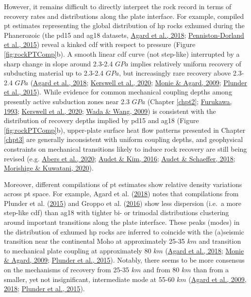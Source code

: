 However, it remains difficult to directly interpret the rock record in terms of recovery rates and distributions along the plate interface. For example, compiled \gls{pt} estimates representing the global distribution of \gls{hp} rocks exhumed during the Phanerozoic (the pd15 and ag18 datasets, \protect\hyperlink{ref-agard2018}{Agard et al., 2018}; \protect\hyperlink{ref-penniston2015}{Penniston-Dorland et al., 2015}) reveal a kinked \gls{cdf} with respect to pressure (Figure \ref{fig:rockPTComp}b). A smooth linear \gls{cdf} curve (not step-like) interrupted by a sharp change in slope around 2.3-2.4 \(GPa\) implies relatively uniform recovery of subducting material up to 2.3-2.4 \(GPa\), but increasingly rare recovery above 2.3-2.4 \(GPa\) (\protect\hyperlink{ref-agard2018}{Agard et al., 2018}; \protect\hyperlink{ref-kerswell2020}{Kerswell et al., 2020}; \protect\hyperlink{ref-monie2009}{Monie \& Agard, 2009}; \protect\hyperlink{ref-plunder2015}{Plunder et al., 2015}). While evidence for common mechanical coupling depths among presently active subduction zones near 2.3 \(GPa\) (Chapter \ref{chpt2}; \protect\hyperlink{ref-furukawa1993}{Furukawa, 1993}; \protect\hyperlink{ref-kerswell2020}{Kerswell et al., 2020}; \protect\hyperlink{ref-wada2009}{Wada \& Wang, 2009}) is consistent with the distribution of recovery depths implied by pd15 and ag18 (Figure \ref{fig:rockPTComp}b), upper-plate surface heat flow patterns presented in Chapter \ref{chpt3} are generally inconsistent with uniform coupling depths, and geophysical constraints on mechanical transitions likely to induce rock recovery are still being revised (e.g. \protect\hyperlink{ref-abers2020}{Abers et al., 2020}; \protect\hyperlink{ref-audet2016}{Audet \& Kim, 2016}; \protect\hyperlink{ref-audet2018}{Audet \& Schaeffer, 2018}; \protect\hyperlink{ref-morishige2020}{Morishige \& Kuwatani, 2020}).

Moreover, different compilations of \gls{pt} estimates show relative density variations across \gls{pt} space. For example, Agard et al. (\protect\hyperlink{ref-agard2018}{2018}) notes that compilations from Plunder et al. (\protect\hyperlink{ref-plunder2015}{2015}) and Groppo et al. (\protect\hyperlink{ref-groppo2016}{2016}) show less dispersion (i.e.~a more step-like \gls{cdf}) than ag18 with tighter bi- or trimodal distributions clustering around important transitions along the plate interface. These peaks (modes) in the distribution of exhumed \gls{hp} rocks are inferred to coincide with the (a)seismic transition near the continental Moho at approximately 25-35 \(km\) and transition to mechanical plate coupling at approximately 80 \(km\) (\protect\hyperlink{ref-agard2018}{Agard et al., 2018}; \protect\hyperlink{ref-monie2009}{Monie \& Agard, 2009}; \protect\hyperlink{ref-plunder2015}{Plunder et al., 2015}). Notably, there seems to be more consensus on the mechanisms of recovery from 25-35 \(km\) and from 80 \(km\) than from a smaller, yet not insignificant, intermediate mode at 55-60 \(km\) (\protect\hyperlink{ref-agard2009}{Agard et al., 2009}, \protect\hyperlink{ref-agard2018}{2018}; \protect\hyperlink{ref-plunder2015}{Plunder et al., 2015}).

